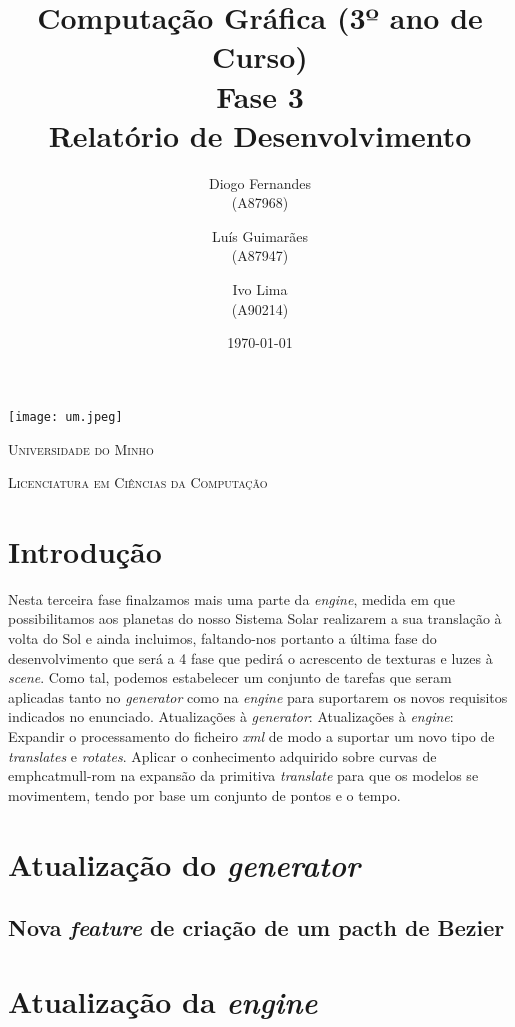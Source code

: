 \documentclass[11pt,a4paper]{report}
\title{Computação Gráfica (3º ano de Curso)\\
       \textbf{Fase 3}\\ Relatório de Desenvolvimento
       } %
\author{Diogo Fernandes\\ (A87968) \and Luís Guimarães\\ (A87947)
         \and Ivo Lima\\ (A90214)
       } %
\date{\today} %
\begin{document}
	\begin{minipage}{0.9\linewidth}
        \centering
		\texttt{[image: um.jpeg]}\par\vspace{1cm}
		{\scshape\LARGE Universidade do Minho} \par
		\vspace{0.6cm}
		{\scshape\Large Licenciatura em Ciências da Computação} \par
		\maketitle
	\end{minipage}


\tableofcontents %

\chapter{Introdução}

Nesta terceira fase finalzamos mais uma parte da \emph{engine}, medida em que possibilitamos aos planetas do nosso Sistema Solar realizarem a sua translação à volta do Sol e ainda incluimos, faltando-nos portanto a última fase do desenvolvimento que será a 4 fase que pedirá o acrescento de texturas e luzes à \emph{scene}. 
Como tal, podemos estabelecer um conjunto de tarefas que seram aplicadas tanto no \emph{generator} como na \emph{engine} para suportarem os novos requisitos indicados no enunciado. 
Atualizações à \emph{generator}:
Atualizações à \emph{engine}:
Expandir o processamento do ficheiro \emph{xml} de modo a suportar um novo tipo de \emph{translates} e \emph{rotates}.
Aplicar o conhecimento adquirido sobre curvas de emph{catmull-rom} na expansão da primitiva \emph{translate} para que os modelos se movimentem, tendo por base um conjunto de pontos e o tempo.

\chapter{Atualização do \emph{generator}}
\section{Nova \emph{feature} de criação de um pacth de Bezier}


\chapter{Atualização da \emph{engine}}
\end{document}
